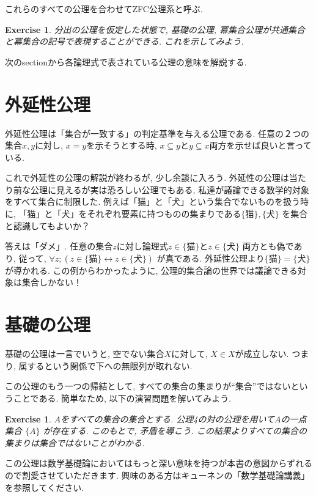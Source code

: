 \documentclass[lualatex]{ltjsbook}
\theoremstyle{remark}
\theoremstyle{plain}
\newtheorem{exercise}[theorem]{Exercise}
\begin{document}
これらのすべての公理を合わせてZFC公理系と呼ぶ.

\begin{exercise}
	分出の公理を仮定した状態で, 基礎の公理, 冪集合公理が共通集合と冪集合の記号で表現することができる. これを示してみよう.

\end{exercise}

次のsectionから各論理式で表されている公理の意味を解説する.

\section{外延性公理}

外延性公理は「集合が一致する」の判定基準を与える公理である. 任意の２つの集合$x, y$に対し, $x=y$を示そうとする時,  $x \subseteq y$と$y \subseteq x$両方を示せば良いと言っている.

これで外延性の公理の解説が終わるが, 少し余談に入ろう.
外延性の公理は当たり前な公理に見えるが実は恐ろしい公理でもある, 
私達が議論できる数学的対象をすべて集合に制限した. 
例えば「猫」と「犬」という集合でないものを扱う時に, 「猫」と「犬」をそれぞれ要素に持つものの集まりである$\{\text{猫}\}, \{\text{犬}\} $ を集合と認識してもよいか？


答えは「ダメ」. 任意の集合$z$に対し論理式$ z \in \{\text{猫}\} $と$z \in \{\text{犬}\} $ 両方とも偽であり, 従って, $\forall z ;\left( z \in \{\text{猫}\} \leftrightarrow z \in \{\text{犬}\}  \right) $ が真である. 外延性公理より$\{\text{猫}\} = \{\text{犬}\}$が導かれる. この例からわかったように, 公理的集合論の世界では議論できる対象は集合しかない！


\section{基礎の公理}
基礎の公理は一言でいうと, 空でない集合$X$に対して, $X \in X$が成立しない. つまり, 属するという関係で下への無限列が取れない. 

この公理のもう一つの帰結として, すべての集合の集まりが“集合”ではないということである. 簡単なため, 以下の演習問題を解いてみよう.

\begin{exercise}
	$A$をすべての集合の集合とする.  公理4の対の公理を用いて$A$の一点集合 $\{A\} $ が存在する. このもとで, 矛盾を導こう. この結果よりすべての集合の集まりは集合ではないことがわかる.
\end{exercise}

この公理は数学基礎論においてはもっと深い意味を持つが本書の意図からずれるので割愛させていただきます. 興味のある方はキューネンの「数学基礎論講義」を参照してください.
\end{document}
